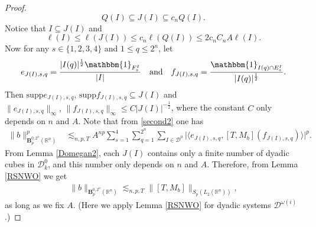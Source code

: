 \documentclass[oneside,english,a4wide]{amsart}
\numberwithin{equation}{section}
\numberwithin{figure}{section}
\theoremstyle{plain}
\theoremstyle{plain}
\theoremstyle{definition}
\theoremstyle{plain}
\newtheorem{lem}[thm]{\protect\lemmaname}
\theoremstyle{remark}
\theoremstyle{definition}
\theoremstyle{remark}
\theoremstyle{definition}
\providecommand{\lemmaname}{Lemma}
\newcommand{\8}{\infty}
\begin{document}
\begin{proof}
	\begin{equation*}
		Q(I)\subseteq J(I)\subseteq c_n Q(I).
	\end{equation*}
	Notice that $I\subseteq J(I)$ and
	\begin{equation*}
		\ell(I)\leq \ell(J(I))\le c_n\ell(Q(I))\le 2c_nC_nA\ell(I).
	\end{equation*}
    Now for any $s\in\{1,2,3,4\}$ and $1\le q\le 2^n$, let
	\begin{equation*}
		e_{J(I),s,q}=\frac{|I(q)|^{\frac{1}{2}}\mathbbm{1}_{F_s^I}}{|I|} \quad \text{and} \quad f_{J(I),s,q}=\frac{\mathbbm{1}_{I(q)\cap E_s^I}}{|I(q)|^{\frac{1}{2}}}.
	\end{equation*}
	Then  $\mathrm{supp}e_{J(I),s,q},\,\mathrm{supp}f_{J(I),s,q}\subseteq J(I)$ and $\|e_{J(I),s,q}\|_{\infty},\,\|f_{J(I),s,q}\|_{\infty}\le C|J(I)|^{-\frac{1}{2}}$, where 
	the constant $C$ only depends on $n$ and $A$. Note that from \eqref{second2} one has
	\begin{align*}
		\|b\|^p_{\pmb{B}_p^{0,2^n}(\mathbb{R}^n)}&\lesssim_{n,p,T}A^{np}\sum_{s=1}^4\sum_{q=1}^{2^n}\sum_{I\in\mathcal{D}^0}\Big|\big\langle e_{J(I),s,q}, [T,M_b](f_{J(I),s,q})\big\rangle\Big|^p.
	\end{align*}
	From Lemma \ref{Domegan2}, each $J(I)$ contains only a finite number of dyadic cubes in $\mathcal{D}_k^0$, and this number only depends on $n$ and $A$. Therefore, from Lemma \ref{RSNWO} we get
	\begin{equation*}
		\begin{aligned}
			\|b\|_{\pmb{B}_p^{0,2^n}(\mathbb{R}^n)}
			\lesssim_{n,p,T} \|[T,M_b]\|_{S_p(L_2(\mathbb{R}^n))},
		\end{aligned}
	\end{equation*}
	as long as we fix $A$. (Here we apply Lemma \ref{RSNWO} for dyadic systems $ \mathcal{D}^{\omega(i)}$.)
\end{proof}



\end{document}
